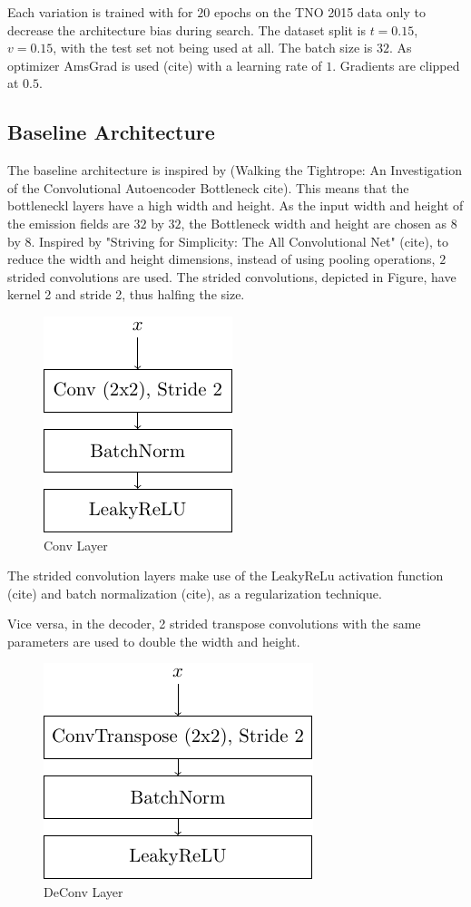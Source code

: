 Each variation is trained with for $20$ epochs on the TNO 2015 data only to decrease the architecture bias during search.
The dataset split is $t=0.15$, $v=0.15$, with the test set not being used at all.
The batch size is $32$.
As optimizer AmsGrad is used (cite) with a learning rate of $1$.
Gradients are clipped at $0.5$.

\subsection{Baseline Architecture}
The baseline architecture is inspired by (Walking the Tightrope: An Investigation of the Convolutional Autoencoder Bottleneck cite).
This means that the bottleneckl layers have a high width and height.
As the input width and height of the emission fields are $32$ by $32$, the Bottleneck width and height are chosen as $8$ by $8$.
Inspired by "Striving for Simplicity: The All Convolutional Net" (cite), to reduce the width and height dimensions, instead of using pooling operations, $2$ strided convolutions are used.
The strided convolutions, depicted in Figure, have kernel 2 and stride 2, thus halfing the size.
\begin{figure}[h!]
    \centering
    \includegraphics[]{figures/model_architecture/build/conv_layer.pdf}
    \caption{Conv Layer}
\end{figure}
The strided convolution layers make use of the LeakyReLu activation function (cite) and batch normalization (cite), as a regularization technique.

Vice versa, in the decoder, 2 strided transpose convolutions with the same parameters are used to double the width and height.
\begin{figure}[h!]
    \centering
    \includegraphics[]{figures/model_architecture/build/deconv_layer.pdf}
    \caption{DeConv Layer}
\end{figure}

